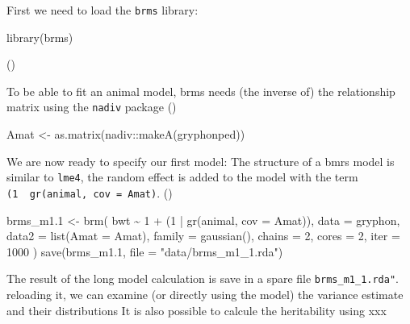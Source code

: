 \documentclass[
  12pt,
]{book}
\newenvironment{Shaded}{\begin{snugshade}}{\end{snugshade}}
\newcommand{\AttributeTok}[1]{\textcolor[rgb]{0.77,0.63,0.00}{#1}}
\newcommand{\DecValTok}[1]{\textcolor[rgb]{0.00,0.00,0.81}{#1}}
\newcommand{\FloatTok}[1]{\textcolor[rgb]{0.00,0.00,0.81}{#1}}
\newcommand{\FunctionTok}[1]{\textcolor[rgb]{0.00,0.00,0.00}{#1}}
\newcommand{\NormalTok}[1]{#1}
\newcommand{\OtherTok}[1]{\textcolor[rgb]{0.56,0.35,0.01}{#1}}
\newcommand{\SpecialCharTok}[1]{\textcolor[rgb]{0.00,0.00,0.00}{#1}}
\newcommand{\StringTok}[1]{\textcolor[rgb]{0.31,0.60,0.02}{#1}}
\begin{document}
First we need to load the \texttt{brms} library:

\begin{Shaded}
\begin{Highlighting}[]
\FunctionTok{library}\NormalTok{(brms)}
\end{Highlighting}
\end{Shaded}

()

To be able to fit an animal model, brms needs (the inverse of) the relationship matrix using the \texttt{nadiv} package ()

\begin{Shaded}
\begin{Highlighting}[]
\NormalTok{Amat }\OtherTok{\textless{}{-}} \FunctionTok{as.matrix}\NormalTok{(nadiv}\SpecialCharTok{::}\FunctionTok{makeA}\NormalTok{(gryphonped))}
\end{Highlighting}
\end{Shaded}

We are now ready to specify our first model:
The structure of a bmrs model is similar to \texttt{lme4}, the random effect is added to the model with the term \texttt{(1\ \textbar{}\ gr(animal,\ cov\ =\ Amat)}. ()

\begin{Shaded}
\begin{Highlighting}[]
\NormalTok{brms\_m1}\FloatTok{.1} \OtherTok{\textless{}{-}} \FunctionTok{brm}\NormalTok{(}
\NormalTok{  bwt }\SpecialCharTok{\textasciitilde{}} \DecValTok{1} \SpecialCharTok{+}\NormalTok{ (}\DecValTok{1} \SpecialCharTok{|} \FunctionTok{gr}\NormalTok{(animal, }\AttributeTok{cov =}\NormalTok{ Amat)),}
  \AttributeTok{data =}\NormalTok{ gryphon,}
  \AttributeTok{data2 =} \FunctionTok{list}\NormalTok{(}\AttributeTok{Amat =}\NormalTok{ Amat),}
  \AttributeTok{family =} \FunctionTok{gaussian}\NormalTok{(),}
  \AttributeTok{chains =} \DecValTok{2}\NormalTok{, }\AttributeTok{cores =} \DecValTok{2}\NormalTok{, }\AttributeTok{iter =} \DecValTok{1000}
\NormalTok{)}
\FunctionTok{save}\NormalTok{(brms\_m1}\FloatTok{.1}\NormalTok{, }\AttributeTok{file =} \StringTok{"data/brms\_m1\_1.rda"}\NormalTok{)}
\end{Highlighting}
\end{Shaded}

The result of the long model calculation is save in a spare file \texttt{brms\_m1\_1.rda"}.
reloading it, we can examine (or directly using the model) the variance estimate and their distributions
It is also possible to calcule the heritability using xxx
\end{document}
